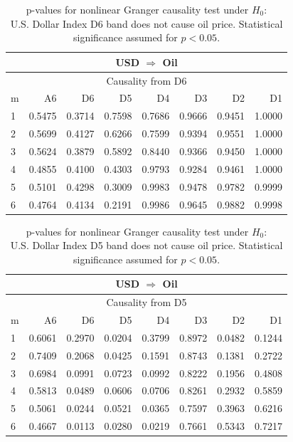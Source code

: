 %
%
\begin{table}[H]
\begin{center}
\begin{tabular}{l|r r r r r r r}
\hline\hline
\multicolumn{8}{c}{USD $\Rightarrow$ Oil}\\
\hline
\multicolumn{8}{c}{Causality from D6}\\
\hline\hline
m & A6 & D6 & D5 & D4 & D3 & D2 & D1 \\
\hline
1 & 0.5475 & 0.3714 & 0.7598 & 0.7686 & 0.9666 & 0.9451 & 1.0000 \\
2 & 0.5699 & 0.4127 & 0.6266 & 0.7599 & 0.9394 & 0.9551 & 1.0000 \\
3 & 0.5624 & 0.3879 & 0.5892 & 0.8440 & 0.9366 & 0.9450 & 1.0000 \\
4 & 0.4855 & 0.4100 & 0.4303 & 0.9793 & 0.9284 & 0.9461 & 1.0000 \\
5 & 0.5101 & 0.4298 & 0.3009 & 0.9983 & 0.9478 & 0.9782 & 0.9999 \\
6 & 0.4764 & 0.4134 & 0.2191 & 0.9986 & 0.9645 & 0.9882 & 0.9998 \\
\hline\hline
\end{tabular}
\caption{p-values for nonlinear Granger causality test under $H_0$:\\
U.S. Dollar Index D6 band does not cause oil price. Statistical significance assumed for $p<0.05$.}
\end{center}
\end{table}

%
%
\begin{table}[H]
\begin{center}
\begin{tabular}{l|r r r r r r r}
\hline\hline
\multicolumn{8}{c}{USD $\Rightarrow$ Oil}\\
\hline
\multicolumn{8}{c}{Causality from D5}\\
\hline\hline
m & A6 & D6 & D5 & D4 & D3 & D2 & D1 \\
\hline
1 & 0.6061 & 0.2970 & \cellcolor{mygreen}0.0204 & 0.3799 & 0.8972 & \cellcolor{mygrey}0.0482 & 0.1244 \\
2 & 0.7409 & 0.2068 & \cellcolor{mygreen}0.0425 & 0.1591 & 0.8743 & 0.1381 & 0.2722 \\
3 & 0.6984 & 0.0991 & 0.0723 & 0.0992 & 0.8222 & 0.1956 & 0.4808 \\
4 & 0.5813 & \cellcolor{mygrey}0.0489 & 0.0606 & 0.0706 & 0.8261 & 0.2932 & 0.5859 \\
5 & 0.5061 & \cellcolor{mygrey}0.0244 & 0.0521 & \cellcolor{mygreen}0.0365 & 0.7597 & 0.3963 & 0.6216 \\
6 & 0.4667 & \cellcolor{mygrey}0.0113 & \cellcolor{mygrey}0.0280 & \cellcolor{mygreen}0.0219 & 0.7661 & 0.5343 & 0.7217 \\
\hline\hline
\end{tabular}
\caption{p-values for nonlinear Granger causality test under $H_0$:\\
U.S. Dollar Index D5 band does not cause oil price. Statistical significance assumed for $p<0.05$.}
\end{center}
\end{table}

